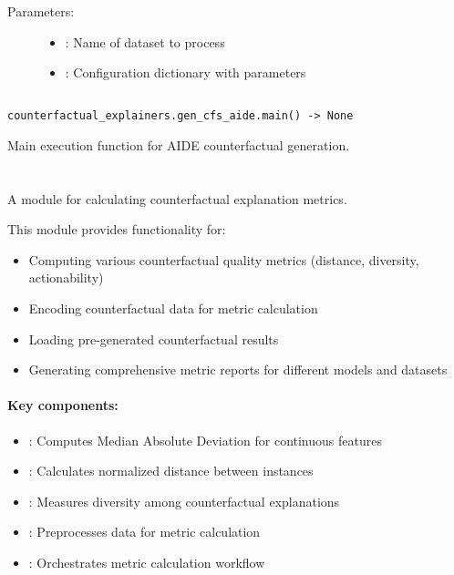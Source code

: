 \begin{description}
    \item[Parameters:]
        \begin{itemize}
            \item {}: Name of dataset to process
            \item {}: Configuration dictionary with parameters
        \end{itemize}
\end{description}

\subsection{}
\label{func:gen_cfs_aide_main}

\begin{lstlisting}
counterfactual_explainers.gen_cfs_aide.main() -> None
\end{lstlisting}

Main execution function for AIDE counterfactual generation.


\section{}
\label{sec:calculate_metrics}

A module for calculating counterfactual explanation metrics.

This module provides functionality for:
\begin{itemize}
    \item Computing various counterfactual quality metrics (distance, diversity, actionability)
    \item Encoding counterfactual data for metric calculation
    \item Loading pre-generated counterfactual results
    \item Generating comprehensive metric reports for different models and datasets
\end{itemize}

\paragraph{Key components:}
\begin{itemize}
    \item {}: Computes Median Absolute Deviation for continuous features
    \item {}: Calculates normalized distance between instances
    \item {}: Measures diversity among counterfactual explanations
    \item {}: Preprocesses data for metric calculation
    \item {}: Orchestrates metric calculation workflow
\end{itemize}


